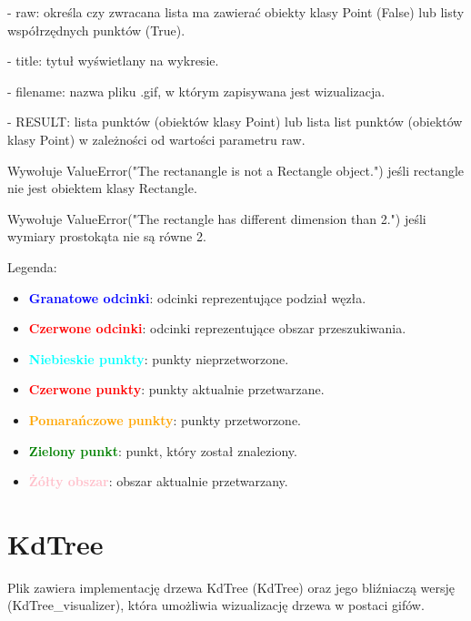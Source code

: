 \documentclass{lab}
\begin{document}
\begin{itemize}
  - raw: określa czy zwracana lista ma zawierać obiekty klasy Point (False) lub listy współrzędnych punktów (True).

  - title: tytuł wyświetlany na wykresie.

  - filename: nazwa pliku .gif, w którym zapisywana jest wizualizacja.

  - RESULT: lista punktów (obiektów klasy Point) lub lista list punktów (obiektów klasy Point) w zależności od wartości parametru raw.

  Wywołuje ValueError("The rectanangle is not a Rectangle object.") jeśli rectangle nie jest obiektem klasy Rectangle.

  Wywołuje ValueError("The rectangle has different dimension than 2.") jeśli wymiary prostokąta nie są równe 2.

  Legenda:
  \begin{itemize}
      \item \textbf{\textcolor{blue}{Granatowe odcinki}}: odcinki reprezentujące podział węzła.
      \item \textbf{\textcolor{red}{Czerwone odcinki}}: odcinki reprezentujące obszar przeszukiwania.
      \item \textbf{\textcolor{cyan}{Niebieskie punkty}}: punkty nieprzetworzone.
      \item \textbf{\textcolor{red}{Czerwone punkty}}: punkty aktualnie przetwarzane.
      \item \textbf{\textcolor{orange}{Pomarańczowe punkty}}: punkty przetworzone.
      \item \textbf{\textcolor{green}{Zielony punkt}}: punkt, który został znaleziony.
      \item \textbf{\textcolor{pink}{Żółty obszar}}: obszar aktualnie przetwarzany.
  \end{itemize}
\end{itemize}

\section{KdTree}
Plik zawiera implementację drzewa KdTree (KdTree) oraz jego bliźniaczą wersję (KdTree\_visualizer), która umożliwia wizualizację drzewa w postaci gifów.
\end{document}
